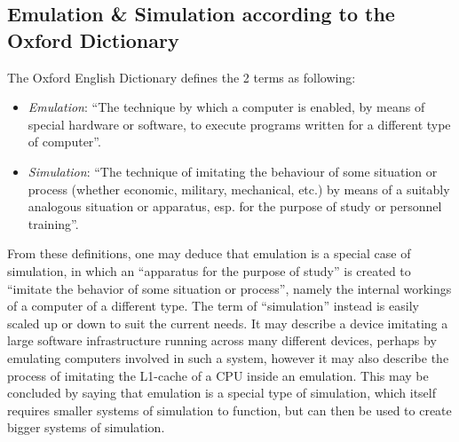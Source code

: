 \subsection{Emulation \& Simulation according to the Oxford Dictionary}
The Oxford English Dictionary defines the 2 terms as following:
\begin{itemize}
    \item \emph{Emulation}: \enquote{The technique by which a
    computer is enabled, by means of special
    hardware or software, to execute programs
    written for a different type of computer}\cite[p. 196]{emulation_oxford}.
    \item \emph{Simulation}: \enquote{The technique of imitating the behaviour of
    some situation or process (whether economic,
    military, mechanical, etc.) by means of a
    suitably analogous situation or apparatus, esp.
    for the purpose of study or personnel training}\cite[p.503]{simulation_oxford}.
\end{itemize}
From these definitions, one may deduce that emulation is a special case of simulation,
in which an \enquote{apparatus for the purpose of study} is created to \enquote{imitate the behavior of some situation or process},
namely the internal workings of a computer of a different type.\linebreak
The term of \enquote{simulation} instead is easily scaled up or down to suit the current needs.
It may describe a device imitating a large software infrastructure running across many different devices,
perhaps by emulating computers involved in such a system,
however it may also describe the process of imitating the L1-cache of a CPU inside an emulation.\linebreak
This may be concluded by saying that emulation is a special type of simulation,
which itself requires smaller systems of simulation to function,
but can then be used to create bigger systems of simulation.

